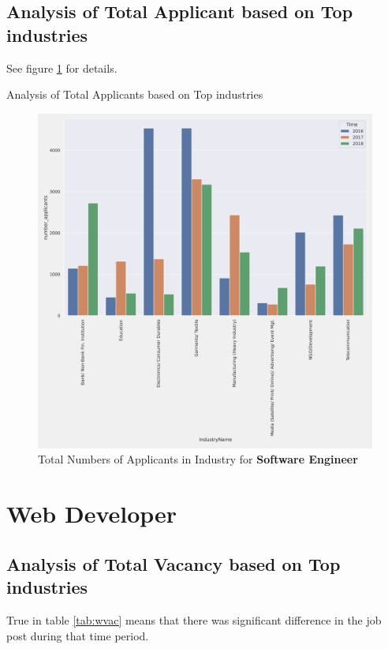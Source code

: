 \documentclass{article}
\begin{document}
\pagebreak
\subsection{Analysis of Total Applicant based on Top industries}
See figure \ref{fig:sapp} for details.

\begin{table}[!htb]
	\centering
	\caption{Analysis of Total Applicants based on Top industries}
	\label{tab:sapp}
\end{table}
\begin{figure}[!h]
	\centering
	\label{fig:sapp}
	\caption{Total Numbers of Applicants in Industry for \textbf{Software Engineer}}
	\includegraphics[scale=0.5]{Graphs/Software Engineer_number_applicants_ttest.png}
\end{figure}
\pagebreak

\section{Web Developer}
\subsection{Analysis of Total Vacancy based on Top industries}
True in table \ref{tab:wvac} means that there was significant difference in the job post during that time period.
\end{document}
